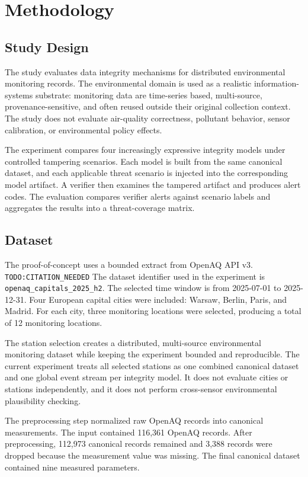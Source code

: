\section{Methodology}

\subsection{Study Design}

The study evaluates data integrity mechanisms for distributed environmental monitoring records. The environmental domain is used as a realistic information-systems substrate: monitoring data are time-series based, multi-source, provenance-sensitive, and often reused outside their original collection context. The study does not evaluate air-quality correctness, pollutant behavior, sensor calibration, or environmental policy effects.

The experiment compares four increasingly expressive integrity models under controlled tampering scenarios. Each model is built from the same canonical dataset, and each applicable threat scenario is injected into the corresponding model artifact. A verifier then examines the tampered artifact and produces alert codes. The evaluation compares verifier alerts against scenario labels and aggregates the results into a threat-coverage matrix.

\subsection{Dataset}

The proof-of-concept uses a bounded extract from OpenAQ API v3. \texttt{TODO:CITATION\_NEEDED} The dataset identifier used in the experiment is \texttt{openaq\_capitals\_2025\_h2}. The selected time window is from 2025-07-01 to 2025-12-31. Four European capital cities were included: Warsaw, Berlin, Paris, and Madrid. For each city, three monitoring locations were selected, producing a total of 12 monitoring locations.

The station selection creates a distributed, multi-source environmental monitoring dataset while keeping the experiment bounded and reproducible. The current experiment treats all selected stations as one combined canonical dataset and one global event stream per integrity model. It does not evaluate cities or stations independently, and it does not perform cross-sensor environmental plausibility checking.

The preprocessing step normalized raw OpenAQ records into canonical measurements. The input contained 116,361 OpenAQ records. After preprocessing, 112,973 canonical records remained and 3,388 records were dropped because the measurement value was missing. The final canonical dataset contained nine measured parameters.

